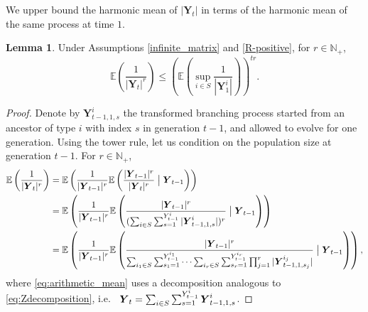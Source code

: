 \documentclass[preprint,3p,12pt]{elsarticle}
\theoremstyle{definition}
\newtheorem{lemma}{Lemma}
\newcommand{\Y}[1][]{%
  \ifx\relax#1\relax
    \boldsymbol{Y}_{t-1, 1, s}^{i}%
  \else
    \boldsymbol{Y}_{t-1, 1, s_{#1}}^{i_{#1}}%
  \fi
}
\begin{document}
We upper bound the harmonic mean of $|\boldsymbol{Y}_t|$ in terms of the harmonic mean of the same process at time $1$.
\begin{lemma}\label{y_upper}
Under Assumptions \ref{infinite_matrix} and \ref{R-positive}, for $r\in\mathbb{N}_+$, %
    \begin{equation*}
       \mathbb{E}\left(\frac{1}{|\boldsymbol{Y}_t|^r}\right) \le   \left(\mathbb{E}\left(\sup_{i \in S}\frac{1}{|\boldsymbol{Y}_{1}^{i}|}\right)\right)^{tr} .
    \end{equation*}
\end{lemma}
\begin{proof}
Denote by $\boldsymbol{Y}_{t-1, 1, s}^i$ the transformed branching process started from an ancestor of type $i$ with index $s$ in generation $t-1$, and allowed to evolve for one generation. Using the tower rule, let us condition on the population size at generation $t-1$. For $r \in \mathbb{N}_+$,
\begin{align}
    \mathbb{E}\left(\frac{1}{|\boldsymbol{Y}_t|^r}\right) %
    &= \mathbb{E}\left(\frac{1}{|\boldsymbol{Y}_{t-1}|^r}\mathbb{E}\left(\frac{|\boldsymbol{Y}_{t-1}|^r}{|\boldsymbol{Y}_t|^r}\bigm| \boldsymbol{Y}_{t-1}\right)\right) \nonumber \\
    &= \mathbb{E}\left(\frac{1}{|\boldsymbol{Y}_{t-1}|^r}\mathbb{E}\left(\frac{|\boldsymbol{Y}_{t-1}|^r}{(\sum_{i \in S}\sum_{s=1}^{Y_{t-1}^i}|\Y|)^r}\bigm| \boldsymbol{Y}_{t-1}\right)\right) \label{eq:arithmetic_mean} \\
    &= \mathbb{E}\left(\frac{1}{|\boldsymbol{Y}_{t-1}|^r}\mathbb{E}\left(\frac{|\boldsymbol{Y}_{t-1}|^r}{\sum_{i_1 \in S}\sum_{s_1=1}^{Y_{t-1}^{i_1}} \dots \sum_{i_r \in S}\sum_{s_r=1}^{Y_{t-1}^{i_r}}\prod_{j=1}^r|\Y[j]|}\bigm| \boldsymbol{Y}_{t-1}\right)\right), \label{eq:expanded} 
\end{align}
where \eqref{eq:arithmetic_mean} uses a decomposition analogous to \eqref{eq:Zdecomposition}, i.e.\ 
$
\boldsymbol{Y}_t = \sum_{i \in S}\sum_{s=1}^{Y_{t-1}^i}\Y
$.

\end{proof}
\end{document}
